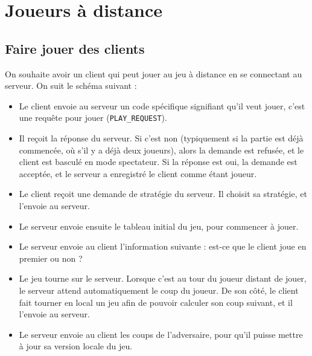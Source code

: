 \documentclass[a4paper]{article}
\begin{document}
\section{Joueurs à distance}

\subsection{Faire jouer des clients}

On souhaite avoir un client qui peut jouer au jeu à distance en se connectant au serveur. On suit le schéma suivant :

%
\begin{itemize}
	\setlength\itemsep{0.5em}
	\item Le client envoie au serveur un code spécifique signifiant qu'il veut jouer, c'est une requête pour jouer (\texttt{PLAY\_REQUEST}).
	\item Il reçoit la réponse du serveur. Si c'est non (typiquement si la partie est déjà commencée, où s'il y a déjà deux joueurs), alors la demande est refusée, et le client est basculé en mode spectateur. Si la réponse est oui, la demande est acceptée, et le serveur a enregistré le client comme étant joueur.
	\item Le client reçoit une demande de stratégie du serveur. Il choisit sa stratégie, et l'envoie au serveur.
	\item Le serveur envoie ensuite le tableau initial du jeu, pour commencer à jouer.
	\item Le serveur envoie au client l'information suivante : est-ce que le client joue en premier ou non ?
	\item Le jeu tourne sur le serveur. Lorsque c'est au tour du joueur distant 
	de jouer, le serveur attend automatiquement le coup du joueur. De son côté, 
	le client fait tourner en local un jeu afin de pouvoir calculer son coup 
	suivant, et il l'envoie au serveur.
	\item Le serveur envoie au client les coups de l'adversaire, pour qu'il puisse mettre à jour sa version locale du jeu.
\end{itemize}
%
\end{document}

